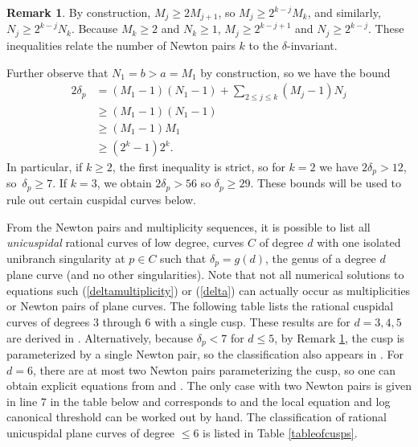 \documentclass[JEP,XML,SOM,Unicode,NoFloatCountersInSection,published]{cedram}
\theoremstyle{plain}
\theoremstyle{definition}
\newtheorem{remark}[theorem]{Remark}
\begin{document}
\begin{remark}\label{rmk:boundonnewtonpairs}
By construction, $M_{j} \ge 2M_{j+1}$, so $M_j \ge 2^{k-j}M_k$, and similarly, $N_j\ge 2^{k-j} N_k$. Because $M_k \ge 2$ and $N_k \ge 1$, $M_j \ge 2^{k-j+1}$ and $N_j \ge 2^{k-j}$. These inequalities relate the number of Newton pairs $k$ to the $\delta$-invariant.

Further observe that $N_1 = b > a = M_1$ by construction, so we have the bound
\begin{align*}
2\delta_p &= (M_1-1)(N_1-1) + \sum_{2\le j\le k}(M_j-1)N_j \\
&\ge (M_1 - 1)(N_1 - 1) \\
&\ge (M_1 -1)M_1 \\
& \ge (2^k - 1)2^k.
\end{align*}
\noindent In particular, if $k \ge 2$, the first inequality is strict, so for $k = 2$ we have $2 \delta_p > 12$, so~$\delta_p \ge 7$. If $k = 3$, we obtain $2\delta_p > 56$ so $\delta_p \ge 29$. These bounds will be used to rule out certain cuspidal curves below.
\end{remark}

From the Newton pairs and multiplicity sequences, it is possible to list all \textit{unicuspidal} rational curves of low degree, \ie curves $C$ of degree $d$ with one isolated unibranch singularity at $p \in C$ such that $\delta_p = g(d)$, the genus of a degree $d$ plane curve (and no other singularities). Note that not all numerical solutions to equations such (\ref{deltamultiplicity}) or (\ref{delta}) can actually occur as multiplicities or Newton pairs of plane curves. The following table lists the rational cuspidal curves of degrees $3$ through $6$ with a single cusp. These results are for $d = 3, 4, 5$ are derived in \cite[Tables 3.1, 3.2, 6.1]{MoeThesis}. Alternatively, because $\delta_p < 7$ for $d \le 5$, by Remark \ref{rmk:boundonnewtonpairs}, the cusp is parameterized by a single Newton pair, so the classification also appears in \cite[Th.\,1.1]{Unicuspidalcurves}. For $d = 6$, there are at most two Newton pairs parameterizing the cusp, so one can obtain explicit equations from \cite[Th.\,1.1]{Unicuspidalcurves} and \cite[Th.\,1.1]{TKThesis}. The only case with two Newton pairs is given in line 7 in the table below and corresponds to \cite[Th.\,1.1(4)]{TKThesis} and the local equation and log canonical threshold can be worked out by hand. The classification of rational unicuspidal plane curves of degree $\le 6$ is listed in Table \ref{tableofcusps}.
\end{document}
